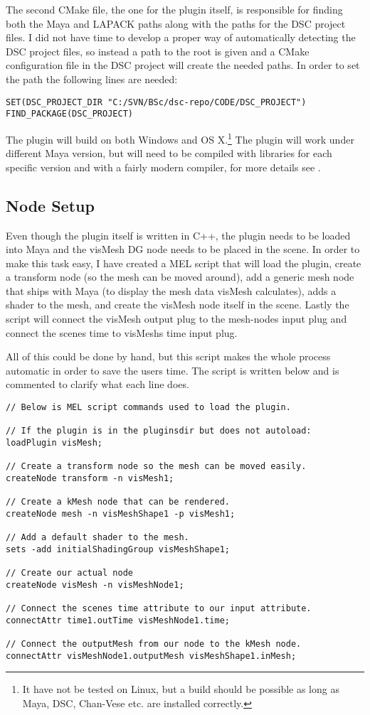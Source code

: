 The second CMake file, the one for the plugin itself, is responsible for finding
both the Maya and LAPACK paths along with the paths for the DSC project files.
I did not have time to develop a proper way of automatically detecting the DSC
project files, so instead a path to the root is given and a CMake configuration
file in the DSC project will create the needed paths. In order to set the path
the following lines are needed:
\begin{lstlisting}
SET(DSC_PROJECT_DIR "C:/SVN/BSc/dsc-repo/CODE/DSC_PROJECT")
FIND_PACKAGE(DSC_PROJECT)
\end{lstlisting}
The plugin will build on both Windows and OS X.\footnote{It have not be tested
on Linux, but a build should be possible as long as Maya, DSC, Chan-Vese etc.
are installed correctly.} The plugin will work under different Maya version,
but will need to be compiled with libraries for each specific version and with
a fairly modern compiler, for more details see \cite{Mayareq}.

\subsection{Node Setup}
\label{sec:melsetup}

Even though the plugin itself is written in C++, the plugin needs to be loaded
into Maya and the visMesh DG node needs to be placed in the scene. In order to
make this task easy, I have created a MEL script that will load the plugin,
create a transform node (so the mesh can be moved around), add a generic mesh
node that ships with Maya (to display the mesh data visMesh calculates), adds a
shader to the mesh, and create the visMesh node itself in the scene. Lastly the
script will connect the visMesh output plug to the mesh-nodes input plug and
connect the scenes time to visMeshs time input plug.

All of this could be done by hand, but this script makes the whole process
automatic in order to save the users time. The script is written below and is
commented to clarify what each line does.

\begin{lstlisting}
// Below is MEL script commands used to load the plugin.

// If the plugin is in the pluginsdir but does not autoload:
loadPlugin visMesh;

// Create a transform node so the mesh can be moved easily.
createNode transform -n visMesh1;

// Create a kMesh node that can be rendered.
createNode mesh -n visMeshShape1 -p visMesh1;

// Add a default shader to the mesh.
sets -add initialShadingGroup visMeshShape1;

// Create our actual node
createNode visMesh -n visMeshNode1;

// Connect the scenes time attribute to our input attribute.
connectAttr time1.outTime visMeshNode1.time;

// Connect the outputMesh from our node to the kMesh node.
connectAttr visMeshNode1.outputMesh visMeshShape1.inMesh;
\end{lstlisting}